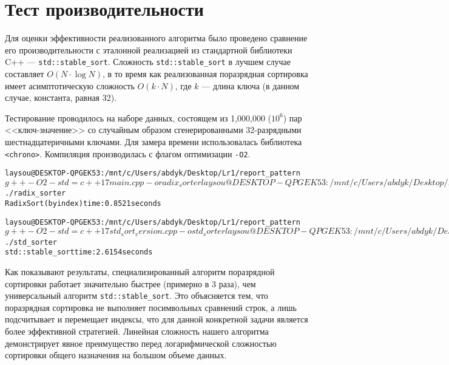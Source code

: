 \section{Тест производительности}

Для оценки эффективности реализованного алгоритма было проведено сравнение его производительности с эталонной реализацией из стандартной библиотеки C++ --- \texttt{std::stable\_sort}. Сложность \texttt{std::stable\_sort} в лучшем случае составляет $O(N \cdot \log N)$, в то время как реализованная поразрядная сортировка имеет асимптотическую сложность $O(k \cdot N)$, где $k$ --- длина ключа (в данном случае, константа, равная 32).

Тестирование проводилось на наборе данных, состоящем из 1,000,000 ($10^6$) пар <<ключ-значение>> со случайным образом сгенерированными 32-разрядными шестнадцатеричными ключами. Для замера времени использовалась библиотека \texttt{<chrono>}. Компиляция производилась с флагом оптимизации \texttt{-O2}.

\begin{alltt}
laysou@DESKTOP-QPGEK53:/mnt/c/Users/abdyk/Desktop/Lr1/report_pattern$ g++ -O2 -std=c++17 main.cpp -o radix_sorter
laysou@DESKTOP-QPGEK53:/mnt/c/Users/abdyk/Desktop/Lr1/report_pattern$ ./radix_sorter
Radix Sort (by index) time: 0.8521 seconds

laysou@DESKTOP-QPGEK53:/mnt/c/Users/abdyk/Desktop/Lr1/report_pattern$ g++ -O2 -std=c++17 std_sort_version.cpp -o std_sorter
laysou@DESKTOP-QPGEK53:/mnt/c/Users/abdyk/Desktop/Lr1/report_pattern$ ./std_sorter
std::stable_sort time: 2.6154 seconds
\end{alltt}

Как показывают результаты, специализированный алгоритм поразрядной сортировки работает значительно быстрее (примерно в 3 раза), чем универсальный алгоритм \texttt{std::stable\_sort}. Это объясняется тем, что поразрядная сортировка не выполняет посимвольных сравнений строк, а лишь подсчитывает и перемещает индексы, что для данной конкретной задачи является более эффективной стратегией. Линейная сложность нашего алгоритма демонстрирует явное преимущество перед логарифмической сложностью сортировки общего назначения на большом объеме данных.

\pagebreak